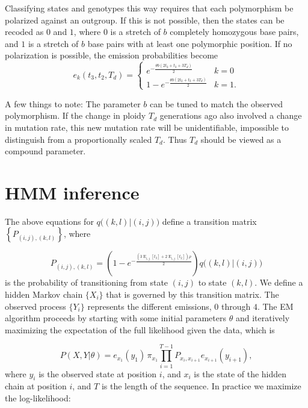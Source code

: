 \documentclass{article}
\DeclareMathOperator{\E}{E}
\begin{document}
Classifying states and genotypes this way requires that each polymorphism be
polarized against an outgroup. If this is not possible, then the states can be
recoded as $0$ and $1$, where $0$ is a stretch of $b$ completely homozygous
base pairs, and $1$ is a stretch of $b$ base pairs with at least one
polymorphic position. If no polarization is possible, the emission
probabilities become
\begin{equation}
    e_k(t_3,t_2, T_d) =
    \begin{cases}
        e^{-\frac{\theta b \left(2t_2+t_3+3T_d\right)}{2}}&k=0\\
        1-e^{-\frac{\theta b \left(2t_2+t_3+3T_d\right)}{2}}&k=1.
    \end{cases}
    \label{eq:emissionprobsnopolar}
\end{equation}

A few things to note: The parameter $b$ can be tuned to match the observed
polymorphism. If the change in ploidy $T_d$ generations ago also involved a
change in mutation rate, this new mutation rate will be unidentifiable,
impossible to distinguish from a proportionally scaled $T_d$. Thus $T_d$ should
be viewed as a compound parameter.

\section{HMM inference}

The above equations for $q\big((k,l)|(i,j)\big)$ define a transition matrix
$\left\{P_{(i,j), (k,l)}\right\}$, where

\begin{equation}
    P_{(i,j), (k,l)} =
    \left(1-e^{-\frac{(3\E_{i,j}[t_3]+2\E_{i,j}[t_2])\rho}{2}}\right)
        q\big((k,l)|(i,j)\big)
\end{equation}
is the probability of transitioning from state $(i,j)$ to state $(k,l)$. We
define a hidden Markov chain $\{X_i\}$ that is governed by this transition matrix.
The observed process $\{Y_i\}$ represents the different emissions, $0$ through
$4$. The EM algorithm proceeds by starting with some initial parameters
$\theta$ and iteratively maximizing the expectation of the full likelihood
given the data, which is

\begin{equation}
    P(X,Y | \theta) =
        e_{x_1}(y_1)\,\pi_{x_1}\prod_{i=1}^{T-1}P_{x_i,x_{i+1}}e_{x_{i+1}}(y_{i+1}),
\end{equation}
where $y_i$ is the observed state at position $i$, and $x_i$ is the state of
the hidden chain at position $i$, and $T$ is the length of the sequence. In
practice we maximize the log-likelihood:
\end{document}
